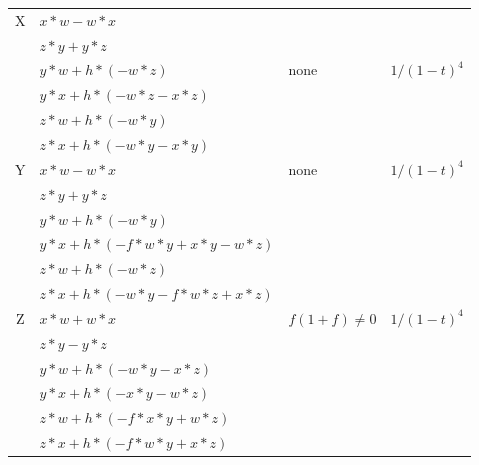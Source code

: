\documentclass[12]{article}
\begin{document}
\begin{longtable}[c]{|c|p{5.75cm}|p{2.75cm}|c|}
\hline
 X & $ x*w - w*x $ & & \\ 
    & $ z*y + y*z $ & &  \\ 
   & $ y*w + h*(-w*z) $ & none & $ 1/(1-t)^4 $ \\  
   & $ y*x + h*(-w*z - x*z ) $ & & \\  
   & $ z*w + h*(-w*y ) $ & & \\ 
   & $ z*x + h*(-w*y - x*y ) $ & &  \\  
\hline
 Y & $ x*w - w*x $ &\multirow{6}{*}{none} &\multirow{6}{*}{$ 1/(1-t)^4 $} \\ 
    & $ z*y + y*z $ & &  \\ 
   & $ y*w + h*(-w*y) $ & & \\
   & $ y*x + h*(-f*w*y + x*y - w*z ) $ & & \\  
   & $ z*w + h*(-w*z ) $ & & \\ 
   & $ z*x + h*(-w*y - f*w*z + x*z ) $ & &  \\  
\hline
 Z & $ x*w + w*x $ &\multirow{6}{*}{ $ f(1+f) \neq 0 $} &\multirow{6}{*}{$ 1/(1-t)^4 $} \\ 
    & $ z*y - y*z $ & &  \\ 
   & $ y*w + h*(-w*y - x*z ) $ & & \\  
   & $ y*x + h*(-x*y - w*z ) $ & & \\  
   & $ z*w + h*(-f*x*y + w*z ) $ & & \\ 
   & $ z*x + h*(-f*w*y + x*z ) $ & &  \\  
\bottomrule
\end{longtable}

\pagebreak
\end{document}
